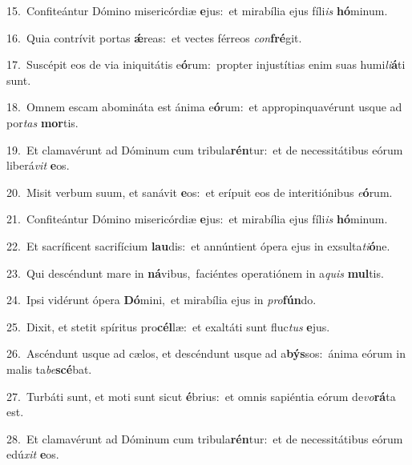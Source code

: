 {\numbfont\textcolor{\numbcolor}{15.}}~Confiteántur Dómino misericórdiæ \textbf{e}\-jus:~\star et mirabília ejus fíli\textit{is} \textbf{hó}\-minum.\par
{\numbfont\textcolor{\numbcolor}{16.}}~Quia contrívit portas \textbf{ǽ}\-reas:~\star et vectes férreos \textit{con}\-\textbf{fré}git.\par
{\numbfont\textcolor{\numbcolor}{17.}}~Suscépit eos de via iniquitátis e\-\textbf{ó}\-rum:~\star propter injustítias enim suas humi\-\textit{li}\-\textbf{á}ti sunt.\par
{\numbfont\textcolor{\numbcolor}{18.}}~Omnem escam abomináta est ánima e\-\textbf{ó}\-rum:~\star et appropinquavérunt usque ad por\textit{tas} \textbf{mor}\-tis.\par
{\numbfont\textcolor{\numbcolor}{19.}}~Et clamavérunt ad Dóminum cum tribula\-\textbf{rén}\-tur:~\star et de necessitátibus eórum liberá\textit{vit} \textbf{e}\-os.\par
{\numbfont\textcolor{\numbcolor}{20.}}~Misit verbum suum, et sanávit \textbf{e}\-os:~\star et erípuit eos de interitiónibus \textit{e}\-\textbf{ó}rum.\par
{\numbfont\textcolor{\numbcolor}{21.}}~Confiteántur Dómino misericórdiæ \textbf{e}\-jus:~\star et mirabília ejus fíli\textit{is} \textbf{hó}\-minum.\par
{\numbfont\textcolor{\numbcolor}{22.}}~Et sacríficent sacrifícium \textbf{lau}\-dis:~\star et annúntient ópera ejus in exsulta\-\textit{ti}\-\textbf{ó}ne.\par
{\numbfont\textcolor{\numbcolor}{23.}}~Qui descéndunt mare in \textbf{ná}\-vibus,~\star faciéntes operatiónem in a\textit{quis} \textbf{mul}\-tis.\par
{\numbfont\textcolor{\numbcolor}{24.}}~Ipsi vidérunt ópera \textbf{Dó}\-mini,~\star et mirabília ejus in \textit{pro}\-\textbf{fún}do.\par
{\numbfont\textcolor{\numbcolor}{25.}}~Dixit, et stetit spíritus pro\-\textbf{cél}\-læ:~\star et exaltáti sunt fluc\textit{tus} \textbf{e}\-jus.\par
{\numbfont\textcolor{\numbcolor}{26.}}~Ascéndunt usque ad cælos, et descéndunt usque ad a\-\textbf{býs}\-sos:~\star ánima eórum in malis ta\-\textit{be}\-\textbf{scé}bat.\par
{\numbfont\textcolor{\numbcolor}{27.}}~Turbáti sunt, et moti sunt sicut \textbf{é}\-brius:~\star et omnis sapiéntia eórum de\-\textit{vo}\-\textbf{rá}ta est.\par
{\numbfont\textcolor{\numbcolor}{28.}}~Et clamavérunt ad Dóminum cum tribula\-\textbf{rén}\-tur:~\star et de necessitátibus eórum edú\textit{xit} \textbf{e}\-os.\par
